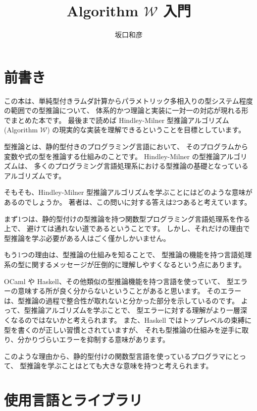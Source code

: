 \documentclass[b5paper]{jsbook}
\title{Algorithm $\mathcal W$ 入門}
\author{坂口和彦}
\theoremstyle{break}
\begin{document}
\maketitle


\section*{前書き}

この本は、単純型付きラムダ計算からパラメトリック多相入りの型システム程度の範囲での型推論について、
体系的かつ理論と実装に一対一の対応が現れる形でまとめた本です。
最後まで読めば Hindley-Milner 型推論アルゴリズム(Algorithm $\mathcal W$)
の現実的な実装を理解できるということを目標としています。

型推論とは、静的型付きのプログラミング言語において、
そのプログラムから変数や式の型を推論する仕組みのことです。
Hindley-Milner の型推論アルゴリズムは、
多くのプログラミング言語処理系における型推論の基礎となっているアルゴリズムです。

そもそも、Hindley-Milner 型推論アルゴリズムを学ぶことにはどのような意味があるのでしょうか。
著者は、この問いに対する答えは2つあると考えています。

まず1つは、静的型付けの型推論を持つ関数型プログラミング言語処理系を作る上で、
避けては通れない道であるということです。
しかし、それだけの理由で型推論を学ぶ必要がある人はごく僅かしかいません。

もう1つの理由は、型推論の仕組みを知ることで、
型推論の機能を持つ言語処理系の型に関するメッセージが圧倒的に理解しやすくなるという点にあります。

OCaml や Haskell、その他類似の型推論機能を持つ言語を使っていて、
型エラーの意味する所が良く分からないということがあると思います。
そのエラーは、型推論の過程で整合性が取れないと分かった部分を示しているのです。
よって、型推論アルゴリズムを学ぶことで、
型エラーに対する理解がより一層深くなるのではないかと考えられます。
また、Haskell ではトップレベルの束縛に型を書くのが正しい習慣とされていますが、
それも型推論の仕組みを逆手に取り、分かりづらいエラーを抑制する意味があります。

このような理由から、静的型付けの関数型言語を使っているプログラマにとって、
型推論を学ぶことはとても大きな意味を持つと考えられます。

\section*{使用言語とライブラリ}
\end{document}
